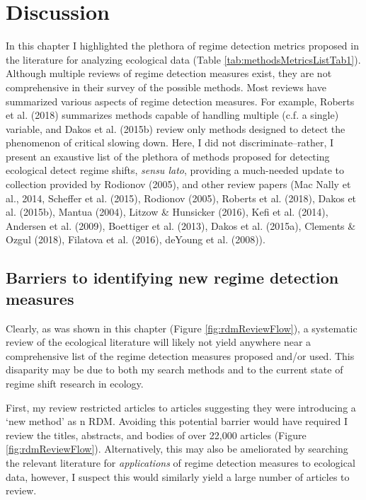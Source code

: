 \documentclass[12pt,twoside,openany]{reedthesis}
\begin{document}
\section{Discussion}\label{discussion}

In this chapter I highlighted the plethora of regime detection metrics
proposed in the literature for analyzing ecological data (Table
\ref{tab:methodsMetricsListTab1}). Although multiple reviews of regime
detection measures exist, they are not comprehensive in their survey of
the possible methods. Most reviews have summarized various aspects of
regime detection measures. For example, Roberts et al. (2018) summarizes
methods capable of handling multiple (c.f. a single) variable, and Dakos
et al. (2015b) review only methods designed to detect the phenomenon of
critical slowing down. Here, I did not discriminate--rather, I present
an exaustive list of the plethora of methods proposed for detecting
ecological detect regime shifts, \emph{sensu lato}, providing a
much-needed update to collection provided by Rodionov (2005), and other
review papers (Mac Nally et al., 2014, Scheffer et al. (2015), Rodionov
(2005), Roberts et al. (2018), Dakos et al. (2015b), Mantua (2004),
Litzow \& Hunsicker (2016), Kefi et al. (2014), Andersen et al. (2009),
Boettiger et al. (2013), Dakos et al. (2015a), Clements \& Ozgul (2018),
Filatova et al. (2016), deYoung et al. (2008)).

\subsection{Barriers to identifying new regime detection
measures}\label{barriers-to-identifying-new-regime-detection-measures}

Clearly, as was shown in this chapter (Figure \ref{fig:rdmReviewFlow}),
a systematic review of the ecological literature will likely not yield
anywhere near a comprehensive list of the regime detection measures
proposed and/or used. This disaparity may be due to both my search
methods and to the current state of regime shift research in ecology.

First, my review restricted articles to articles suggesting they were
introducing a `new method' as n RDM. Avoiding this potential barrier
would have required I review the titles, abstracts, and bodies of over
22,000 articles (Figure \ref{fig:rdmReviewFlow}). Alternatively, this
may also be ameliorated by searching the relevant literature for
\emph{applications} of regime detection measures to ecological data,
however, I suspect this would similarly yield a large number of articles
to review.
\end{document}
